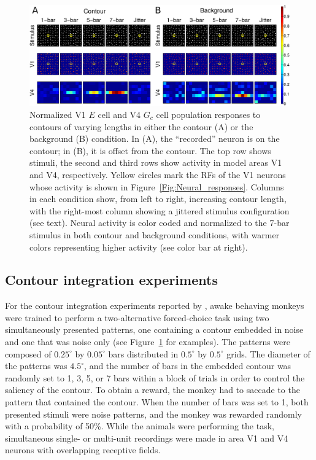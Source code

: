 \begin{figure}[t]
\centering
\includegraphics[width=\textwidth]{Contour/figs/Fig3.eps}
\makeatletter
\let\@currsize\normalsize
\caption[V1 and V4 population responses to contours]{Normalized V1 $E$ cell and V4 $G_c$ cell population responses to contours of varying lengths in either the contour (A) or the background (B) condition. In (A), the ``recorded'' neuron is on the contour; in (B), it is offset from the contour. The top row shows stimuli, the second and third rows show activity in model areas V1 and V4, respectively. Yellow circles mark the RFs of the V1 neurons whose activity is shown in Figure~\ref{Fig:Neural_responses}. Columns in each condition show, from left to right, increasing contour length, with the right-most column showing a jittered stimulus configuration (see text). Neural activity is color coded and normalized to the 7-bar stimulus in both contour and background conditions, with warmer colors representing higher activity (see color bar at right).}
\label{Fig:Contour_Results}
\end{figure}

\subsection{Contour integration experiments} 
\label{sec:contour_exp}

For the contour integration experiments reported by \cite{Chen_etal14}, awake behaving monkeys were trained to perform a two-alternative forced-choice task using two simultaneously presented patterns, one containing a contour embedded in noise and one that was noise only (see Figure~\ref{Fig:Contour_Results} for examples).  The patterns were composed of $0.25^{\circ}$ by $0.05^{\circ}$ bars distributed in $0.5^{\circ}$ by $0.5^{\circ}$ grids.  The diameter of the patterns was $4.5^{\circ}$, and the number of bars in the embedded contour was randomly set to 1, 3, 5, or 7 bars within a block of trials in order to control the saliency of the contour.  To obtain a reward, the monkey had to saccade to the pattern that contained the contour. When the number of bars was set to 1, both presented stimuli were noise patterns, and the monkey was rewarded randomly with a probability of 50\%.  While the animals were performing the task, simultaneous single- or multi-unit recordings were made in area V1 and V4 neurons with overlapping receptive fields.

